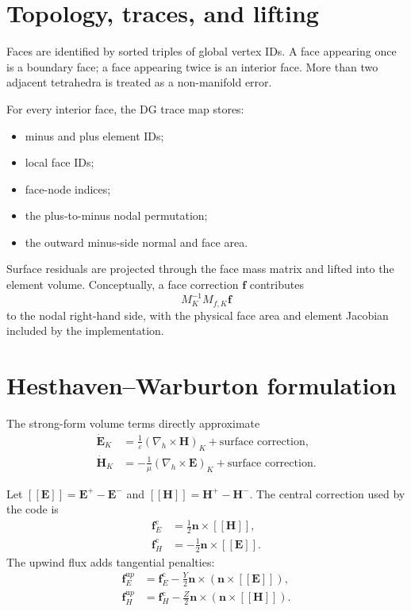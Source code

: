 \documentclass[11pt,oneside]{book}
\newcommand{\vect}[1]{\boldsymbol{#1}}
\newcommand{\jump}[1]{\left[\!\left[#1\right]\!\right]}
\begin{document}
\section{Topology, traces, and lifting}

Faces are identified by sorted triples of global vertex IDs. A face appearing
once is a boundary face; a face appearing twice is an interior face. More than
two adjacent tetrahedra is treated as a non-manifold error.

For every interior face, the DG trace map stores:
\begin{itemize}[leftmargin=*]
  \item minus and plus element IDs;
  \item local face IDs;
  \item face-node indices;
  \item the plus-to-minus nodal permutation;
  \item the outward minus-side normal and face area.
\end{itemize}

Surface residuals are projected through the face mass matrix and lifted into
the element volume. Conceptually, a face correction $\vect f$ contributes
\begin{equation}
  M_K^{-1}M_{f,K}\vect f
\end{equation}
to the nodal right-hand side, with the physical face area and element Jacobian
included by the implementation.

\section{Hesthaven--Warburton formulation}

The strong-form volume terms directly approximate
\begin{align}
  \dot{\vect E}_K &= \frac{1}{\varepsilon}
    (\nabla_h\times\vect H)_K + \text{surface correction},\\
  \dot{\vect H}_K &= -\frac{1}{\mu}
    (\nabla_h\times\vect E)_K + \text{surface correction}.
\end{align}

Let $\jump{\vect E}=\vect E^+-\vect E^-$ and
$\jump{\vect H}=\vect H^+-\vect H^-$. The central correction used by the
code is
\begin{align}
  \vect f_E^{\mathrm c}
    &= \frac{1}{2}\vect n\times\jump{\vect H},\\
  \vect f_H^{\mathrm c}
    &= -\frac{1}{2}\vect n\times\jump{\vect E}.
\end{align}
The upwind flux adds tangential penalties:
\begin{align}
  \vect f_E^{\mathrm up}
    &= \vect f_E^{\mathrm c}
       -\frac{Y}{2}\vect n\times
        \left(\vect n\times\jump{\vect E}\right),\\
  \vect f_H^{\mathrm up}
    &= \vect f_H^{\mathrm c}
       -\frac{Z}{2}\vect n\times
        \left(\vect n\times\jump{\vect H}\right).
\end{align}
\end{document}
